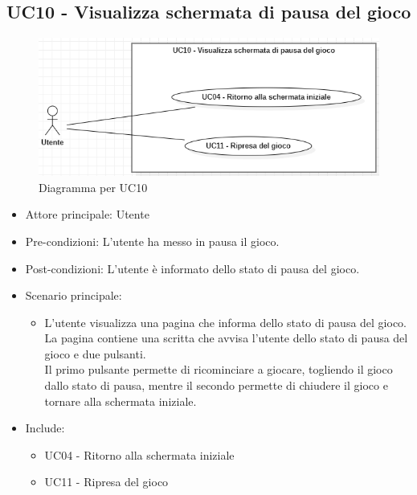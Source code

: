 \subsection{UC10 - Visualizza schermata di pausa del gioco}
\begin{figure}[h]
    \centering
    \includegraphics[width=400pt]{images/usecase/UC10.png}
    \caption{Diagramma per UC10}
    \label{fig:attore}
\end{figure}
\begin{itemize}
    \item Attore principale: Utente
    \item Pre-condizioni: L'utente ha messo in pausa il gioco.
    \item Post-condizioni: L'utente è informato dello stato di pausa del gioco.
    \item Scenario principale: \begin{itemize}
        \item L'utente visualizza una pagina che informa dello stato di pausa del gioco.\\ La pagina contiene una scritta che avvisa l'utente dello stato di pausa del gioco e due pulsanti.\\ Il primo pulsante permette di ricominciare a giocare, togliendo il gioco dallo stato di pausa, mentre il secondo permette di chiudere il gioco e tornare alla schermata iniziale.
    \end{itemize}
    \item Include: \begin{itemize}
        \item UC04 - Ritorno alla schermata iniziale
        \item UC11 - Ripresa del gioco
    \end{itemize}
\end{itemize}

